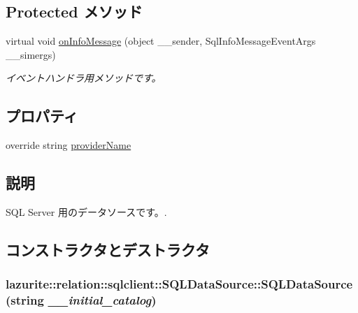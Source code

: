 \subsection*{Protected メソッド}
\begin{DoxyCompactItemize}
\item 
virtual void \hyperlink{classlazurite_1_1relation_1_1sqlclient_1_1_s_q_l_data_source_a52af111a1f9f4d865dcd0d84e166543b}{onInfoMessage} (object \_\-\_\-sender, SqlInfoMessageEventArgs \_\-\_\-simergs)
\begin{DoxyCompactList}\small\item\em イベントハンドラ用メソッドです。 \item\end{DoxyCompactList}\end{DoxyCompactItemize}
\subsection*{プロパティ}
\begin{DoxyCompactItemize}
\item 
override string \hyperlink{classlazurite_1_1relation_1_1sqlclient_1_1_s_q_l_data_source_afb9ccecb64b77e0ff36d1b55a52af87f}{providerName}
\end{DoxyCompactItemize}


\subsection{説明}
SQL Server 用のデータソースです。. 

\subsection{コンストラクタとデストラクタ}
\hypertarget{classlazurite_1_1relation_1_1sqlclient_1_1_s_q_l_data_source_afefa998139f6ea264cb0785270b4c3a0}{
\subsubsection[{SQLDataSource}]{\setlength{\rightskip}{0pt plus 5cm}lazurite::relation::sqlclient::SQLDataSource::SQLDataSource (string {\em \_\-\_\-initial\_\-catalog})}}
\label{classlazurite_1_1relation_1_1sqlclient_1_1_s_q_l_data_source_afefa998139f6ea264cb0785270b4c3a0}


